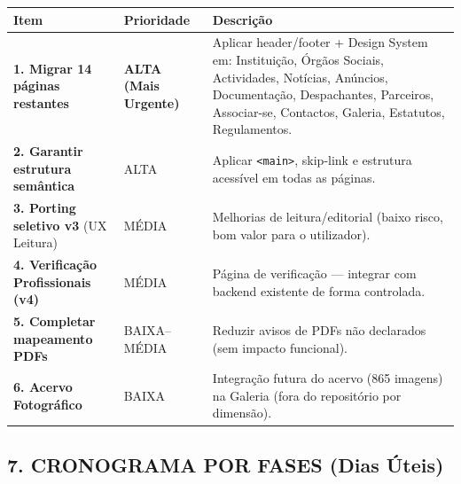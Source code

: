 {\def\LTcaptype{none} %
\begin{longtable}[]{@{}
  >{\raggedright\arraybackslash}p{}
  >{\raggedright\arraybackslash}p{}
  >{\raggedright\arraybackslash}p{}@{}}
\toprule\noalign{}
\begin{minipage}[b]{\linewidth}\raggedright
Item
\end{minipage} & \begin{minipage}[b]{\linewidth}\raggedright
Prioridade
\end{minipage} & \begin{minipage}[b]{\linewidth}\raggedright
Descrição
\end{minipage} \\
\midrule\noalign{}
\endhead
\bottomrule\noalign{}
\endlastfoot
\textbf{1. Migrar 14 páginas restantes} & \textbf{ALTA (Mais Urgente)} &
Aplicar header/footer + Design System em: Instituição, Órgãos Sociais,
Actividades, Notícias, Anúncios, Documentação, Despachantes, Parceiros,
Associar-se, Contactos, Galeria, Estatutos, Regulamentos. \\
\textbf{2. Garantir estrutura semântica} & ALTA & Aplicar
\texttt{\textless{}main\textgreater{}}, skip-link e estrutura acessível
em todas as páginas. \\
\textbf{3. Porting seletivo v3} (UX Leitura) & MÉDIA & Melhorias de
leitura/editorial (baixo risco, bom valor para o utilizador). \\
\textbf{4. Verificação Profissionais (v4)} & MÉDIA & Página de
verificação --- integrar com backend existente de forma controlada. \\
\textbf{5. Completar mapeamento PDFs} & BAIXA--MÉDIA & Reduzir avisos de
PDFs não declarados (sem impacto funcional). \\
\textbf{6. Acervo Fotográfico} & BAIXA & Integração futura do acervo
(865 imagens) na Galeria (fora do repositório por dimensão). \\
\end{longtable}
}

\subsection{7. CRONOGRAMA POR FASES (Dias
Úteis)}\label{cronograma-por-fases-dias-uxfateis}

